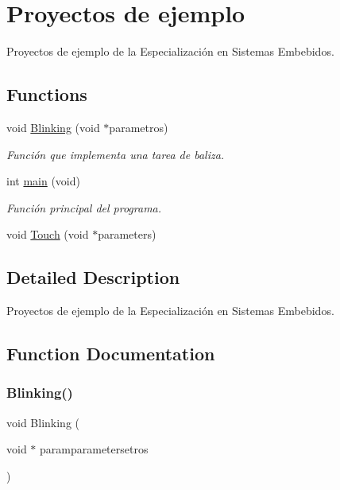 \hypertarget{group__ejemplos}{}\section{Proyectos de ejemplo}
\label{group__ejemplos}


Proyectos de ejemplo de la Especialización en Sistemas Embebidos.  


\subsection*{Functions}
\begin{DoxyCompactItemize}
\item 
void \hyperlink{group__ejemplos_gab645efc6fc4ae6688f33bf5f8b247bab}{Blinking} (void $\ast$parametros)
\begin{DoxyCompactList}\small\item\em Función que implementa una tarea de baliza. \end{DoxyCompactList}\item 
int \hyperlink{group__ejemplos_ga840291bc02cba5474a4cb46a9b9566fe}{main} (void)
\begin{DoxyCompactList}\small\item\em Función principal del programa. \end{DoxyCompactList}\item 
void \hyperlink{group__ejemplos_gacd6f00df9a33b3a50c5c492c0874cb97}{Touch} (void $\ast$parameters)
\end{DoxyCompactItemize}


\subsection{Detailed Description}
Proyectos de ejemplo de la Especialización en Sistemas Embebidos. 



\subsection{Function Documentation}
\mbox{\label{group__ejemplos_gab645efc6fc4ae6688f33bf5f8b247bab}} 
\subsubsection{\texorpdfstring{Blinking()}{Blinking()}}
{\footnotesize\ttfamily void Blinking (\begin{DoxyParamCaption}\item[{void $\ast$}]{paramparametersetros }\end{DoxyParamCaption})}



